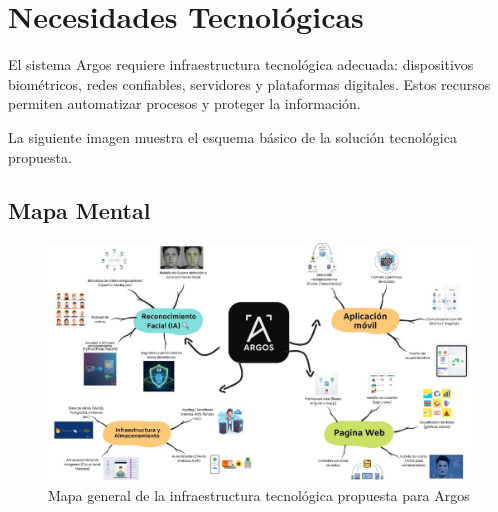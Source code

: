 \section{Necesidades Tecnológicas}

El sistema Argos requiere infraestructura tecnológica adecuada: dispositivos biométricos, redes confiables, servidores y plataformas digitales. Estos recursos permiten automatizar procesos y proteger la información.

La siguiente imagen muestra el esquema básico de la solución tecnológica propuesta.
\subsection{Mapa Mental}

\begin{figure}[H]
    \centering
    \includegraphics[width=1.0\textwidth]{./Media/mapaArgos.jpg}
    \caption{Mapa general de la infraestructura tecnológica propuesta para Argos}
    \label{fig:infraestructura}
\end{figure}